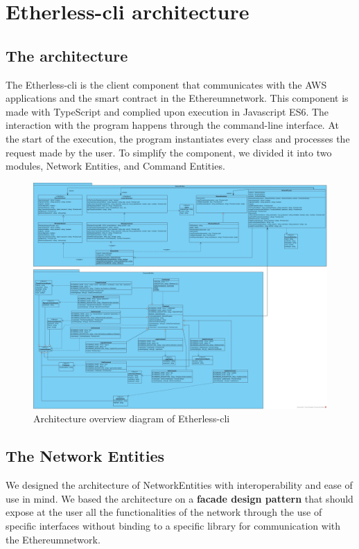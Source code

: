 \section{Etherless-cli architecture}
\subsection{The architecture}
The Etherless-cli is the client component that communicates with the AWS applications and the smart contract in the Ethereum\glo network.
This component is made with TypeScript and complied upon execution in Javascript ES6.
The interaction with the program happens through the command-line interface.
At the start of the execution, the program instantiates every class and processes the request made by the user.
To simplify the component, we divided it into two modules, Network Entities, and Command Entities.

\begin{figure}[h]
	\centering
	\includegraphics[width=\textwidth]{./res/img/Etherless-cli.jpg}
	\caption{Architecture overview diagram of Etherless-cli}
\end{figure}

\subsection{The Network Entities}
We designed the architecture of NetworkEntities with interoperability and ease of use in mind.
We based the architecture on a \textbf{facade design pattern} that should expose at the user all the functionalities
of the network through the use of specific interfaces without binding to a specific library for communication
with the Ethereum\glo network.
